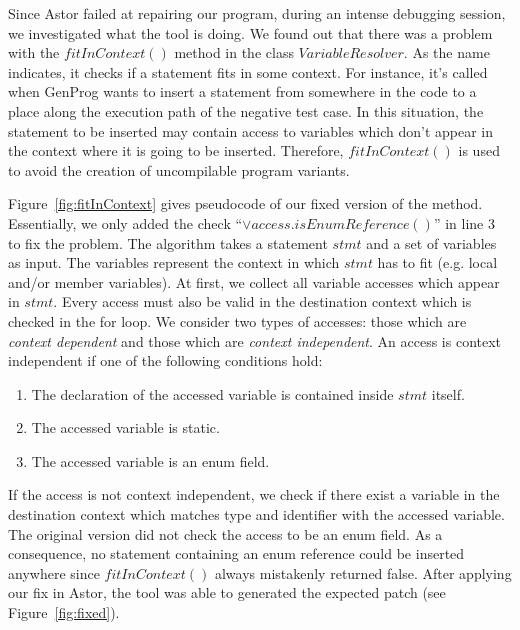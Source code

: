 \documentclass[pdftex,english,oribibl]{llncs}
\begin{document}
Since Astor failed at repairing our program, during an intense debugging session, we investigated what the tool is doing.
We found out that there was a problem with the $fitInContext()$ method in the class $VariableResolver$. As the name indicates, it checks if a statement fits in some context. For instance, it's called when GenProg wants to insert a statement from somewhere in the code to a place along the execution path of the negative test case. In this situation, the statement to be inserted may contain access to variables which don't appear in the context where it is going to be inserted. Therefore, $fitInContext()$ is used to avoid the creation of uncompilable program variants.

Figure~\ref{fig:fitInContext} gives pseudocode of our fixed version of the method.
Essentially, we only added the check ``$\vee access.isEnumReference()$'' in line 3 to fix the problem.
The algorithm takes a statement $stmt$ and a set of variables as input.
The variables represent the context in which $stmt$ has to fit (e.g. local and/or member variables). At first, we collect all variable accesses which appear in $stmt$.
Every access must also be valid in the destination context which is checked in the for loop.
We consider two types of accesses: those which are \emph{context dependent} and those which are \emph{context independent}. 
An access is context independent if one of the following conditions hold:
\begin{enumerate}
	\item The declaration of the accessed variable is contained inside $stmt$ itself.
	\item The accessed variable is static.
	\item The accessed variable is an enum field.
\end{enumerate}
If the access is not context independent, we check if there exist a variable in the destination context which matches type and identifier with the accessed variable.
The original version did not check the access to be an enum field.
As a consequence, no statement containing an enum reference could be inserted anywhere since $fitInContext()$ always mistakenly returned false.
After applying our fix in Astor, the tool was able to generated the expected patch (see Figure~\ref{fig:fixed}).
\end{document}
